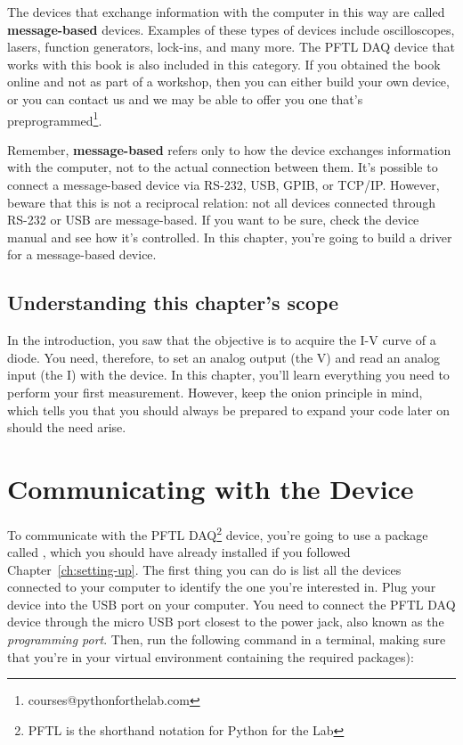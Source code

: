 The devices that exchange information with the computer in this way are called \textbf{message-based} devices. Examples of these types of devices include oscilloscopes, lasers, function generators, lock-ins, and many more. The {PFTL DAQ} device that works with this book is also included in this category. If you obtained the book online and not as part of a workshop, then you can either build your own device, or you can contact us and we may be able to offer you one that's preprogrammed\footnote{courses@pythonforthelab.com}.


Remember, \textbf{message-based} refers only to how the device exchanges information with the computer, not to the actual connection between them. It's possible to connect a message-based device via RS-232, USB, GPIB, or TCP/IP. However, beware that this is not a reciprocal relation: not all devices connected through RS-232 or USB are message-based. If you want to be sure, check the device manual and see how it's controlled. In this chapter, you're going to build a driver for a message-based device.

\subsection{Understanding this chapter's scope}\label{subsec:scope-of-the-chapter}
In the introduction, you saw that the objective is to acquire the I-V curve of a diode. You need, therefore, to set an analog output (the V) and read an analog input (the I) with the device. In this chapter, you'll learn everything you need to perform your first measurement. However, keep the onion principle in mind, which tells you that you should always be prepared to expand your code later on should the need arise.

\section{Communicating with the Device}\label{sec:message-basedevices}
To communicate with the {PFTL DAQ}\footnote{PFTL is the shorthand notation for Python for the Lab} device, you're going to use a package called , which you should have already installed if you followed Chapter~\ref{ch:setting-up}. The first thing you can do is list all the devices connected to your computer to identify the one you're interested in. Plug your device into the USB port on your computer. You need to connect the {PFTL DAQ} device through the micro USB port closest to the power jack, also known as the \emph{programming port}. Then, run the following command in a terminal, making sure that you're in your virtual environment containing the required packages):

